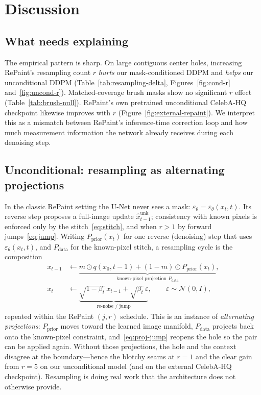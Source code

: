 \section{Discussion}
\label{sec:discussion}

\subsection{What needs explaining}
The empirical pattern is sharp.
On large contiguous center holes, increasing RePaint's resampling count $r$ \emph{hurts} our mask-conditioned DDPM and \emph{helps} our unconditional DDPM (Table~\ref{tab:resampling-delta}, Figures~\ref{fig:cond-r} and~\ref{fig:uncond-r}).
Matched-coverage brush masks show no significant $r$ effect (Table~\ref{tab:brush-null}).
RePaint's own pretrained unconditional CelebA-HQ checkpoint likewise improves with $r$ (Figure~\ref{fig:external-repaint}).
We interpret this as a mismatch between RePaint's inference-time correction loop and how much measurement information the network already receives during each denoising step.

\subsection{Unconditional: resampling as alternating projections}
\label{sec:alt-proj}
In the classic RePaint setting the U-Net never sees a mask: $\varepsilon_\theta=\varepsilon_\theta(x_t,t)$.
Its reverse step proposes a full-image update $\hat{x}_{t-1}^{\mathrm{unk}}$; consistency with known pixels is enforced only by the stitch~\eqref{eq:stitch}, and when $r{>}1$ by forward jumps~\eqref{eq:jump}.
Writing $P_{\mathrm{prior}}(x_t)$ for one reverse (denoising) step that uses $\varepsilon_\theta(x_t,t)$, and $P_{\mathrm{data}}$ for the known-pixel stitch, a resampling cycle is the composition
\begin{align}
  x_{t-1}
  &\leftarrow
  \underbrace{m\odot q(x_0,t{-}1)+(1-m)\odot P_{\mathrm{prior}}(x_t)}_{\text{known-pixel projection }P_{\mathrm{data}}},
  \label{eq:proj-data}\\
  x_{t}
  &\leftarrow
  \underbrace{\sqrt{1-\beta_{t}}\,x_{t-1}+\sqrt{\beta_{t}}\,\varepsilon}_{\text{re-noise / jump}},
  \qquad \varepsilon\sim\mathcal{N}(0,I),
  \label{eq:proj-jump}
\end{align}
repeated within the RePaint $(j,r)$ schedule.
This is an instance of \emph{alternating projections}: $P_{\mathrm{prior}}$ moves toward the learned image manifold, $P_{\mathrm{data}}$ projects back onto the known-pixel constraint, and~\eqref{eq:proj-jump} reopens the hole so the pair can be applied again.
Without those projections, the hole and the context disagree at the boundary---hence the blotchy seams at $r{=}1$ and the clear gain from $r{=}5$ on our unconditional model (and on the external CelebA-HQ checkpoint).
Resampling is doing real work that the architecture does not otherwise provide.


